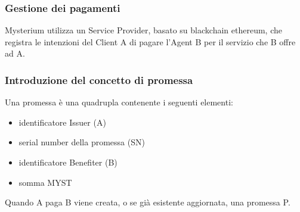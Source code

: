 \documentclass[]{article}
\begin{document}
	\subsubsection{Gestione dei pagamenti}
	Mysterium utilizza un Service Provider, basato su blackchain ethereum, che registra le intenzioni del Client A di pagare l’Agent B per il servizio che B offre ad A.	
	
	\subsubsection{Introduzione del concetto di promessa}
	Una promessa è una quadrupla contenente i seguenti elementi:
	
	\begin{itemize}
	\item identificatore Issuer (A)
	\item serial number della promessa (SN)
	\item identificatore Benefiter (B)
	\item somma MYST
	\end{itemize}	
	Quando A paga B viene creata, o se già esistente aggiornata, una promessa P.
	
\end{document}
